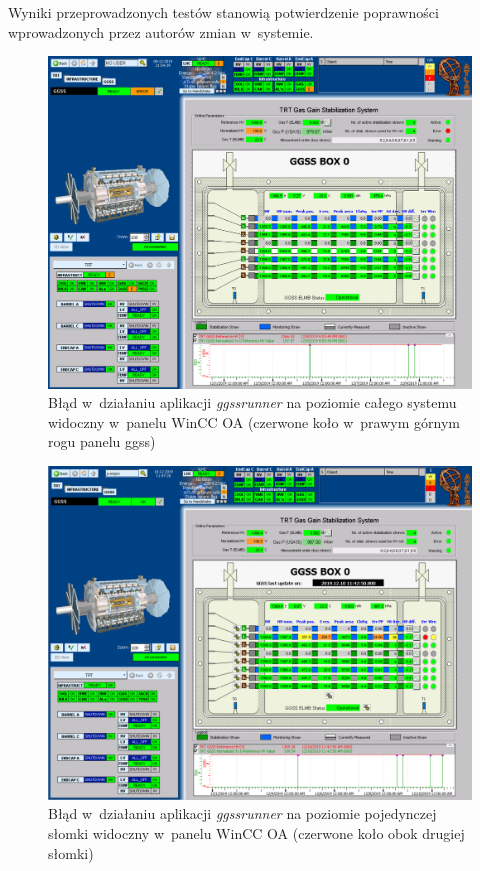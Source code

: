 Wyniki przeprowadzonych testów stanowią potwierdzenie poprawności wprowadzonych przez autorów zmian w~systemie. 

\begin{figure}
\centering
\includegraphics[width=\textwidth]{res/png/ggssError}
\caption{Błąd w~działaniu aplikacji \textit{ggssrunner} na poziomie całego systemu widoczny w~panelu WinCC OA (czerwone koło w~prawym górnym rogu panelu \gls*{ggss})}
\label{fig:ggssErrorScada}
\end{figure}


\begin{figure}
\centering
\includegraphics[width=\textwidth]{res/png/errStraw}
\caption{Błąd w~działaniu aplikacji \textit{ggssrunner} na poziomie pojedynczej słomki widoczny w~panelu WinCC OA (czerwone koło obok drugiej słomki)}
\label{fig:ggssErrorStrawScada}
\end{figure}
